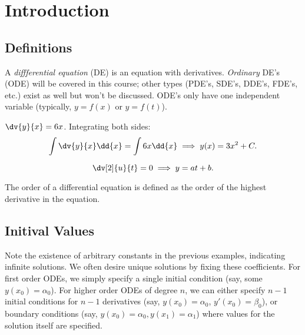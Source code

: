 \section{Introduction}

\subsection{Definitions}

\begin{definition}
    A \emph{diffferential equation} (DE) is an equation with derivatives. \emph{Ordinary} DE's (ODE) will be covered in this course; other types (PDE's, SDE's, DDE's, FDE's, etc.) exist as well but won't be discussed. ODE's only have one independent variable (typically, $y = f(x)$ or $y = f(t)$).
\end{definition}

\begin{example}
    $\dv{y}{x}= 6 x$. Integrating both sides:
    \begin{align*}
        \int \dv{y}{x} \dd{x}= \int 6 x\dd{x} \implies y(x) = 3x^2 + C.
    \end{align*}
\end{example}

\begin{example}
    \[
    \dv[2]{u}{t} = 0 \implies y = at + b.    
    \]
\end{example}

\begin{definition}[Order]
    The order of a differential equation is defined as the order of the highest derivative in the equation.
\end{definition}

\subsection{Initival Values}
\begin{remark}
    Note the existence of arbitrary constants in the previous examples, indicating infinite solutions. We often desire unique solutions by fixing these coefficients. For first order ODEs, we simply specify a single initial condition (say, some $y(x_0) = \alpha_0$). For higher order ODEs of degree $n$, we can either specify $n-1$ initial conditions for $n-1$ derivatives (say, $y(x_0) = \alpha_0$, $y'(x_0) = \beta_0$), or boundary conditions (say, $y(x_0) = \alpha_0, y(x_1) = \alpha_1$) where values for the solution itself are specified.
\end{remark}

